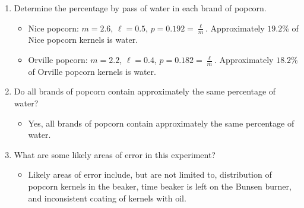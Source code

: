 \documentclass[12pt]{article}
\begin{document}
\begin{enumerate}
  \item Determine the percentage by pass of water in each brand of popcorn.
    \begin{itemize}
      \item Nice popcorn: $m = 2.6$, $\ell = 0.5$,
        $p = 0.192 = \frac{\ell}{m}$. Approximately $19.2$\% of Nice popcorn
        kernels is water.
      \item Orville popcorn: $m = 2.2$, $\ell = 0.4$,
        $p = 0.182 = \frac{\ell}{m}$. Approximately $18.2$\% of Orville popcorn
        kernels is water.
    \end{itemize}
  \item Do all brands of popcorn contain approximately the same percentage of water?
    \begin{itemize}
      \item Yes, all brands of popcorn contain approximately the same
        percentage of water.
    \end{itemize}
  \item What are some likely areas of error in this experiment?
    \begin{itemize}
      \item Likely areas of error include, but are not limited to, distribution
        of popcorn kernels in the beaker, time beaker is left on the Bunsen
        burner, and inconsistent coating of kernels with oil.
    \end{itemize}
\end{enumerate}
\end{document}
